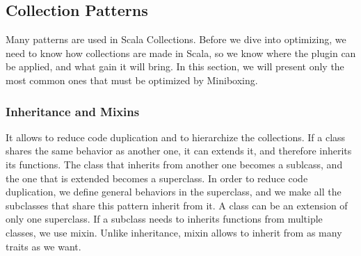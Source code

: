 % 
% 
% 
% 
% 

\subsection{Collection Patterns}

Many patterns are used in Scala Collections. Before we dive into optimizing, we need to know how collections are made in Scala, so we know where the plugin can be applied, and what gain it will bring. In this section, we will present only the most common ones that must be optimized by Miniboxing. 


\subsubsection{Inheritance and Mixins}

 It allows to reduce code duplication and to hierarchize the collections. If a class shares the same behavior as another one, it can extends it, and therefore inherits its functions. The class that inherits from another one becomes a sublcass, and the one that is extended becomes a superclass. In order to reduce code duplication, we define general behaviors in the superclass, and we make all the subclasses that share this pattern inherit from it. A class can be an extension of only one superclass. If a subclass needs to inherits functions from multiple classes, we use mixin. Unlike inheritance, mixin allows to inherit from as many traits as we want.

